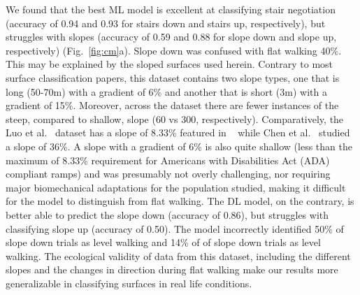 \documentclass[sensors,article,submit,pdftex,moreauthors]{Definitions/mdpi}
\begin{document}
We found that the best ML model is excellent at classifying stair negotiation (accuracy of \textcolor{revision2}{0.94 and 0.93} for stairs down and stairs up, respectively), but struggles with slopes (accuracy of \textcolor{revision2}{0.59 and 0.88} for slope down and slope up, respectively) (Fig.~\ref{fig:cm}a). Slope down \textcolor{revision2}{was} confused with flat walking \textcolor{revision2}{40\%}. This may be explained by the sloped surfaces used herein. Contrary to most surface classification papers, this dataset contains two slope types, one that is long (\textcolor{revision}{50-70}m) with a gradient of 6\% and another that is short (3m) with a gradient of 15\%. 
\textcolor{revision}{Moreover, across the dataset  there are fewer instances of the steep, compared to shallow, slope (60 vs 300, respectively).} Comparatively, the Luo et al.~\cite{Luo_2020} dataset has a slope of 8.33\% featured in ~\cite{Shah_2022, chauhan2025classifying, yildiz2023towards, Hu_2021} \textcolor{revision}{while Chen et al.~\cite{Chen2019} studied} a slope of 36\%. 
A slope with a gradient of 6\% is also quite shallow (less than the maximum of 8.33\% requirement for Americans with Disabilities Act (ADA) compliant ramps) and was presumably not overly challenging, nor requiring major biomechanical adaptations for the population studied, \textcolor{revision}{making it difficult for the model to distinguish from flat walking.} The DL model, on the contrary, is better able to predict the slope \textcolor{revision2}{down} (accuracy of \textcolor{revision2}{0.86), but struggles with classifying slope up (accuracy of 0.50).}
The model incorrectly identified \textcolor{revision2}{50}\% of \textcolor{revision2}{slope down} trials as \textcolor{revision2}{level walking} and \textcolor{revision2}{14}\% of \textcolor{revision2}{of slope down trials as level walking}. 
The ecological validity of data from this dataset, including the different slopes and the changes in direction during flat walking make our results more generalizable in classifying surfaces in real life conditions. 
\end{document}

